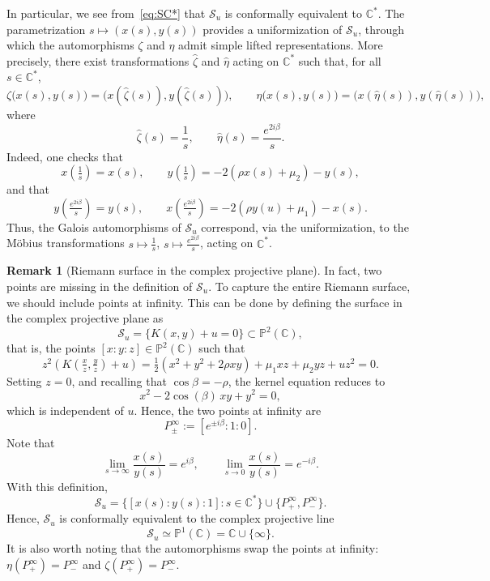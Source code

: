 \documentclass[11pt]{article}
\theoremstyle{definition}
\newtheorem{rem}[thm]{Remark}
\begin{document}
In particular, we see from~\eqref{eq:SC*} that $\mathcal{S}_u$ is conformally equivalent to $\mathbb{C}^*$. 
The parametrization $s \mapsto (x(s),y(s))$ provides a uniformization of $\mathcal S_u$, through which the automorphisms $\zeta$ and $\eta$ admit simple lifted representations.
More precisely, there exist transformations $\widehat\zeta$ and $\widehat\eta$ acting on $\mathbb{C}^*$ such that, for all $s \in \mathbb{C}^*$,
\[
\zeta\bigl(x(s),y(s)\bigr) = \bigl(x(\widehat\zeta(s)),y(\widehat\zeta(s))\bigr),
\qquad
\eta\bigl(x(s),y(s)\bigr) = \bigl(x(\widehat\eta(s)),y(\widehat\eta(s))\bigr),
\]
where
\[
\widehat\zeta(s)=\frac{1}{s},
\qquad
\widehat\eta(s)=\frac{e^{2i\beta}}{s}.
\]
Indeed, one checks that
\[
x\!\left(\tfrac{1}{s}\right)=x(s),
\qquad
y\!\left(\tfrac{1}{s}\right) = -2(\rho x(s)+\mu_2)-y(s),
\]
and that
\[
y\!\left(\tfrac{e^{2i\beta}}{s}\right)=y(s),
\qquad
x\!\left(\tfrac{e^{2i\beta}}{s}\right) = -2(\rho y(u)+\mu_1)-x(s).
\]
Thus, the Galois automorphisms of $\mathcal S_u$ correspond, via the uniformization, to the M\"obius transformations
$s \mapsto \frac{1}{s}$,
$s \mapsto \frac{e^{2i\beta}}{s}$,
acting on $\mathbb{C}^*$.



\begin{rem}[Riemann surface in the complex projective plane]
In fact, two points are missing in the definition of $\mathcal{S}_u$. To capture the entire Riemann surface, we should include points at infinity. This can be done by defining the surface in the complex projective plane as
\[
\mathcal{S}_u=\{K(x,y)+u=0\}\subset \mathbb{P}^2(\mathbb{C}),
\]
that is, the points $[x:y:z]\in \mathbb{P}^2(\mathbb{C})$ such that
\[
z^2\!\left(K\!\left(\tfrac{x}{z},\tfrac{y}{z}\right)+u\right)
=\tfrac12(x^2+y^2+2\rho xy)+\mu_1 xz+\mu_2 yz+u z^2=0.
\]
Setting $z=0$, and recalling that $\cos\beta=-\rho$, the kernel equation reduces to
\[
x^2-2\cos(\beta)\, xy+y^2=0,
\]
which is independent of $u$. Hence, the two points at infinity are
\[
P^\infty_\pm := [e^{\pm i\beta} : 1 : 0].
\]
Note that
\[
\lim_{s\to\infty} \frac{x(s)}{y(s)}=e^{i\beta},
\qquad
\lim_{s\to0} \frac{x(s)}{y(s)}=e^{-i\beta}.
\]
With this definition,
\[
\mathcal{S}_u
=\{[x(s): y(s):1]: s \in \mathbb{C}^*\}\cup\{P^\infty_+,P^\infty_-\}.
\]
Hence, $\mathcal{S}_u$ is conformally equivalent to the complex projective line
\[
\mathcal{S}_u \simeq \mathbb{P}^1 (\mathbb{C})=\mathbb{C}\cup\{\infty\}.
\]
It is also worth noting that the automorphisms swap the points at infinity:
$\eta(P^\infty_+)=P^\infty_-$ and $\zeta(P^\infty_+)=P^\infty_-$.
\end{rem}
\end{document}
